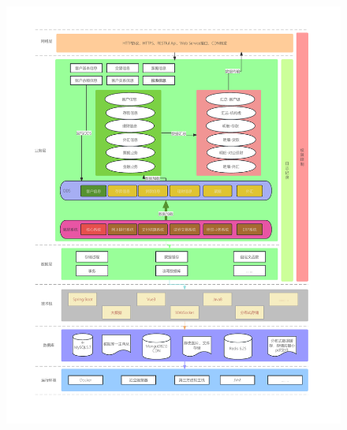 \documentclass[UTF8]{ctexart} %
\begin{document}
\begin{figure}[H]
    \centering
    \includegraphics[width=\textwidth]{assets/系统架构设计.pdf}
\end{figure}
\end{document}
